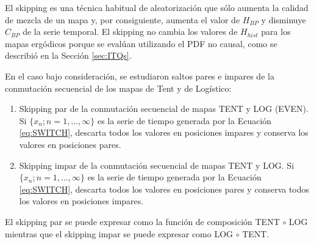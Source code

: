 El skipping es una técnica habitual de aleatorización que sólo aumenta la calidad de mezcla de un mapa y, por consiguiente, aumenta el valor de $H_{BP}$ y disminuye $C_{BP}$ de la serie temporal.
El skipping no cambia los valores de $H_{hist}$ para los mapas ergódicos porque se evalúan utilizando el PDF no causal, como se describió en la Sección \ref{sec:ITQs}.

En el caso bajo consideración, se estudiaron saltos pares e impares de la conmutación secuencial de los mapas de Tent y de Logístico:
\begin{enumerate}
	\item Skipping par de la conmutación secuencial de mapas TENT y LOG (EVEN). \\
	Si $\{x_n; n = 1, \dots, \infty \}$ es la serie de tiempo generada por la Ecuación \ref{eq:SWITCH}, descarta todos los valores en posiciones impares y conserva los valores en posiciones pares.
	\item Skipping impar de la conmutación secuencial de mapas TENT y LOG.
	Si $\{x_n; n = 1, \dots, \infty \}$ es la serie de tiempo generada por la Ecuación \ref{eq:SWITCH}, descarta todos los valores en posiciones pares y conserva todos los valores en posiciones impares.
\end{enumerate}
El skipping par se puede expresar como la función de composición TENT $\circ$ LOG mientras que el skipping impar se puede expresar como LOG $\circ$ TENT.